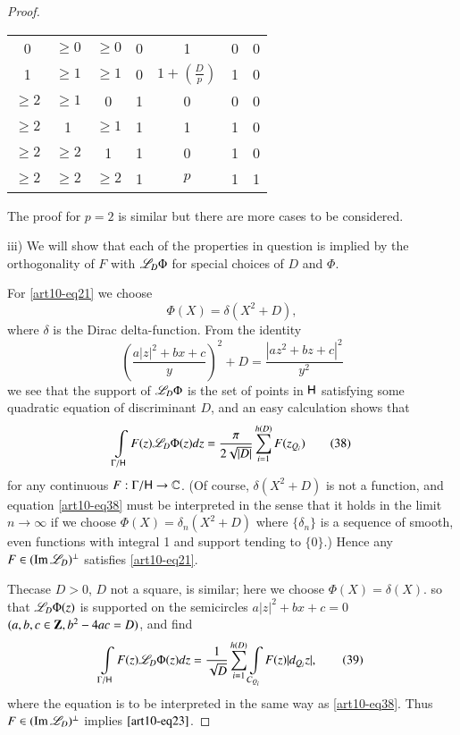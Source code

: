 \begin{proof}
\begin{center}
{\begin{tabular}{ccc|cccc}
0 & $\geqslant 0$ & $\geqslant 0$ & 0 & 1 & 0 & 0 \\
1 & $\geqslant 1$ & $\geqslant 1$ & 0 & $1 + \left(\frac{D}{p} \right)$ & 1 & 0\\
$\geqslant 2$ & $\geqslant 1$ & 0 & 1 & 0 & 0 & 0\\
$\geqslant 2$ & 1 & $\geqslant 1$ & 1 & 1 & 1 & 0\\
$\geqslant 2$ & $\geqslant 2$ & 1 & 1 & 0& 1 & 0\\
$\geqslant 2$ & $\geqslant 2$ & $\geqslant 2$ & 1 & $ p$ & 1 & 1
\end{tabular}}
\end{center}

The proof for $p=2$ is similar but there are more cases to be considered.

iii) We will show that each of the properties in question is implied by the orthogonality of $F$ with $\mathscr{L}_D \Phi$ for special choices of $D$ and $\Phi$. 

For \eqref{art10-eq21} we choose 
$$
\Phi (X) = \delta (X^2 + D), 
$$
where $\delta$ is the Dirac delta-function. From the identity
\begin{equation*}
\left(\frac{a|z|^2 + b x + c}{y} \right)^2 + D = \frac{|az^2 + bz + c|^2}{y^2} \tag{37}\label{art10-eq37}
\end{equation*}
we see that the support of $\mathscr{L}_D \Phi$ is the set of points in $\mathsf{H}$ satisfying some quadratic equation of discriminant $D$, and an easy calculation shows that 
\begin{equation*}
\int\limits_{\Gamma / \mathsf{H}} F (z) \mathscr{L}_D \Phi (z) dz = \frac{\pi}{2 \sqrt{|D|}} \sum\limits^{h(D)}_{ i=1} F (z_{Q_i})  \tag{38}\label{art10-eq38}
\end{equation*}
for any continuous $F: \Gamma / \mathsf{H} \to \mathbb{C}$. (Of course, $\delta (X^2 + D)$ is not a function, and equation \eqref{art10-eq38} must be interpreted in the sense that it holds in the limit $n \to \infty$ if we choose $\Phi (X) = \delta_n (X^2 + D)$ where $\{\delta_n\}$ is a sequence of smooth, even functions with integral 1 and support tending to $\{0\}$.) Hence any $F \in(\operatorname{Im} \mathscr{L}_D)^\perp$ satisfies \eqref{art10-eq21}.

The\pageoriginale case $D > 0$, $D$ not a square, is similar; here we choose $\Phi (X) = \delta (X)$. so that $\mathscr{L}_D \Phi (z)$ is supported on the semicircles $a|z|^2 + b x + c =0$ $(a, b, c \in \mathbf{Z}, b^2 - 4ac =D)$, and find 
\begin{equation*}
\int\limits_{\Gamma / \mathsf{H}} F(z) \mathscr{L}_D \Phi (z) dz = \frac{1}{\sqrt{D}} \sum\limits^{h(D)}_{i=1} \int\limits_{C_{Q_i}} F (z) |d_{Q_i} z|, \tag{39}
\label{art10-eq39} 
\end{equation*}
where the equation is to be interpreted in the same way as \eqref{art10-eq38}. Thus $F \in (\operatorname{Im} \mathscr{L}_D)^\perp$ implies $\eqref{art10-eq23}$.


\end{proof}
